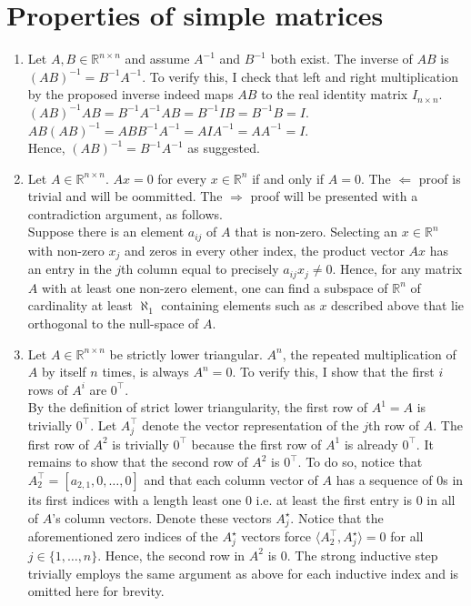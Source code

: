 \documentclass[12pt,fleqn,leqno,letterpaper]{article}
\begin{document}
\section{Properties of simple matrices}
\begin{enumerate}
    \item Let $A,B \in \mathbb{R}^{n\times n}$ and assume $A^{-1}$ and $B^{-1}$
        both exist. The inverse of $AB$ is $(AB)^{-1} = B^{-1}A^{-1}$. To verify
        this, I check that left and right multiplication by the proposed inverse
        indeed maps $AB$ to the real identity matrix $I_{n\times n}$.\\
        $(AB)^{-1}AB = B^{-1}A^{-1}AB = B^{-1}IB = B^{-1}B = I$.\\
        $AB(AB)^{-1} = ABB^{-1}A^{-1} = AIA^{-1} = AA^{-1} = I$.\\
        Hence, $(AB)^{-1} = B^{-1}A^{-1}$ as suggested.

    \item Let $A\in\mathbb{R}^{n\times n}$. $Ax=0$ for every $x\in\mathbb{R}^n$
        if and only if $A=0$. The $\Leftarrow$ proof is trivial and will be
        oommitted. The $\Rightarrow$ proof will be presented with a contradiction
        argument, as follows.\\
        Suppose there is an element $a_{ij}$ of $A$ that is non-zero. Selecting
        an $x\in\mathbb{R}^n$ with non-zero $x_j$ and zeros in every other
        index, the product vector $Ax$ has an entry in the $j$th column equal to
        precisely $a_{ij}x_j\neq 0$. Hence, for any matrix $A$ with at least one
        non-zero element, one can find a subspace of $\mathbb{R}^n$ of
        cardinality at least $\aleph_1$ containing elements such as $x$
        described above that lie orthogonal to the null-space of $A$.

    \item Let $A\in\mathbb{R}^{n\times n}$ be strictly lower triangular. $A^n$,
        the repeated multiplication of $A$ by itself $n$ times, is always
        $A^n=0$. To verify this, I show that the first $i$ rows of $A^i$ are
        $0^\top$.\\
        By the definition of strict lower triangularity, the first row of
        $A^1=A$ is trivially $0^\top$. Let $A_j^\top$ denote the vector
        representation of the $j$th row of $A$. The first row of $A^2$ is
        trivially $0^\top$ because the first row of $A^1$ is already $0^\top$.
        It remains to show that the second row of $A^2$ is $0^\top$. To do so,
        notice that $A_2^\top = [a_{2,1}, 0, \dots, 0]$ and that each
        column vector of $A$ has a sequence of $0$s in its first indices with
        a length least one $0$ i.e. at least the first entry is $0$ in all of
        $A$'s column vectors. Denote these vectors $A_j^\star$. Notice that the
        aforementioned zero indices of the $A_j^\star$ vectors force
        $\langle A_2^\top, A_j^\star \rangle = 0$ for all $j\in\{1,\dots,n\}$.
        Hence, the second row in $A^2$ is $0$. The strong inductive step
        trivially employs the same argument as above for each inductive index
        and is omitted here for brevity.


\end{enumerate}
\end{document}
